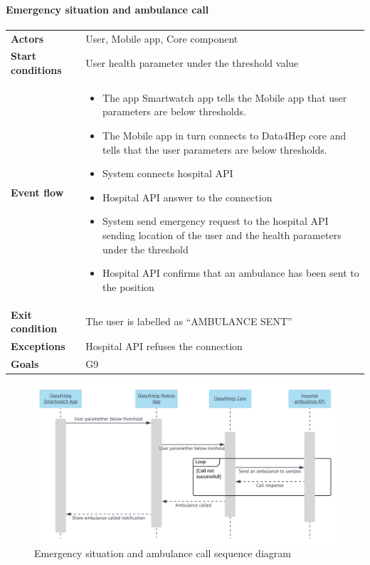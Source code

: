 \paragraph{Emergency situation and ambulance call}
\begin{center}
\begin{table}[H]
\centering
\begin{tabular}{l|p{}}
\textbf{Actors} & User, Mobile app, Core component \\
\textbf{Start conditions} & User health parameter under the threshold value \\
\textbf{Event flow}  & \begin{minipage}[t]{0.7\textwidth}
    \begin{itemize}
       \item The app Smartwatch app tells the Mobile app that user parameters are below thresholds.
       \item The Mobile app in turn connects to Data4Hep core and tells that the user parameters are below thresholds.
\item System connects hospital API 
\item Hospital API answer to the connection
\item System send emergency request to the hospital API sending location of the user and the health parameters under the threshold
\item Hospital API confirms that an ambulance has been sent to the position

    \end{itemize}
    
\end{minipage} \\
\textbf{Exit condition} & The user is labelled as “AMBULANCE SENT” \\
\textbf{Exceptions} & Hospital API refuses the connection \\
\textbf{Goals} & G9 
\end{tabular}

\end{table}
\end{center}
\begin{figure}[H]
  \includegraphics[width=\textwidth,height=\textheight,keepaspectratio]{assets/sequence/EmergencySituationAndAmbulanceCall.pdf}
  \caption{Emergency situation and ambulance call sequence diagram}
  \label{fig:EmergencySituationAndAmbulanceCall}
\end{figure}
